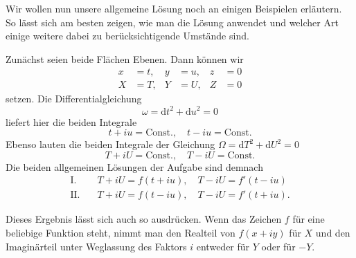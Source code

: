 Wir wollen nun unsere allgemeine Lösung noch an einigen Beispielen erläutern. So lässt sich am besten zeigen, wie man die Lösung anwendet und welcher Art einige weitere dabei zu berücksichtigende Umstände sind.

Zunächst seien beide Flächen Ebenen. Dann können wir
\[
\begin{aligned}
x&=t,&y&=u,&z&=0\\
X&=T,&Y&=U,&Z&=0
\end{aligned}
\]
\noindent setzen. Die Differentialgleichung
\[
\omega=\mathrm{d}t^2+\mathrm{d}u^2=0
\]
\noindent liefert hier die beiden Integrale
\[
t+iu=\text{Const.},\quad t-iu=\text{Const.}
\]
\noindent Ebenso lauten die beiden Integrale der Gleichung \(\Omega=\mathrm{d}T^2+\mathrm{d}U^2=0\)
\[
T+iU=\text{Const.},\quad T-iU=\text{Const.}
\]
\noindent Die beiden allgemeinen Lösungen der Aufgabe sind demnach
\[
\begin{aligned}
\mathrm{I.}\quad&T+iU=f(t+iu),\quad T-iU=f'(t-iu)\\
\mathrm{II.}\quad&T+iU=f(t-iu),\quad T-iU=f'(t+iu).
\end{aligned}
\]
\par\indent{}%
Dieses Ergebnis lässt sich auch so ausdrücken. Wenn das Zeichen \(f\) für eine beliebige Funktion steht, nimmt man den Realteil von \(f(x+iy)\) für \(X\) und den Imaginärteil unter Weglassung des Faktors \(i\) entweder für \(Y\) oder für \(-Y\).

